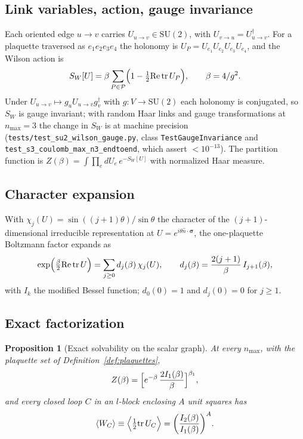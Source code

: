 \documentclass[11pt]{article}
\newtheorem{proposition}{Proposition}
\begin{document}
\subsection{Link variables, action, gauge invariance}

Each oriented edge $u\to v$ carries $U_{u\to v}\in\mathrm{SU}(2)$, with
$U_{v\to u}=U_{u\to v}^{\dagger}$.  For a plaquette traversed as
$e_1e_2e_3e_4$ the holonomy is $U_P=U_{e_1}U_{e_2}U_{e_3}U_{e_4}$, and the
Wilson action is
\begin{equation}
S_W[U] = \beta\sum_{P\in\mathcal{P}}\Bigl(1-\tfrac12\mathrm{Re}\,\mathrm{tr}\,U_P\Bigr),
\qquad \beta = 4/g^2 .
\label{eq:wilson_action}
\end{equation}
Under $U_{u\to v}\mapsto g_uU_{u\to v}g_v^{\dagger}$ with $g:V\to\mathrm{SU}(2)$
each holonomy is conjugated, so $S_W$ is gauge invariant; with random Haar
links and gauge transformations at $n_{\max}=3$ the change in $S_W$ is at
machine precision (\texttt{tests/test\_su2\_wilson\_gauge.py}, class
\texttt{TestGaugeInvariance} and \texttt{test\_s3\_coulomb\_max\_n3\_endtoend},
which assert $<10^{-13}$).  The partition function is
$Z(\beta)=\int\prod_e dU_e\,e^{-S_W[U]}$ with normalized Haar measure.

\subsection{Character expansion}
\label{sec:characters}

With $\chi_j(U)=\sin((j+1)\theta)/\sin\theta$ the character of the
$(j+1)$-dimensional irreducible representation at
$U=e^{i\theta\hat n\cdot\boldsymbol\sigma}$, the one-plaquette Boltzmann
factor expands as~\cite{menotti_onofri1981,creutz1983}
\begin{equation}
\exp\Bigl(\tfrac{\beta}{2}\mathrm{Re}\,\mathrm{tr}\,U\Bigr)
=\sum_{j\ge0} d_j(\beta)\,\chi_j(U),\qquad
d_j(\beta)=\frac{2(j+1)}{\beta}\,I_{j+1}(\beta),
\label{eq:character_expansion}
\end{equation}
with $I_k$ the modified Bessel function; $d_0(0)=1$ and $d_j(0)=0$ for
$j\ge1$.

\subsection{Exact factorization}
\label{sec:factorization}

\begin{proposition}[Exact solvability on the scalar graph]
\label{prop:factorization}
At every $n_{\max}$, with the plaquette set of Definition~\ref{def:plaquettes},
\begin{equation}
Z(\beta) = \Bigl[e^{-\beta}\,\frac{2I_1(\beta)}{\beta}\Bigr]^{\beta_1},
\label{eq:Z_exact}
\end{equation}
and every closed loop $C$ in an $l$-block enclosing $A$ unit squares has
\begin{equation}
\langle W_C\rangle \equiv
\Bigl\langle\tfrac12\mathrm{tr}\,U_C\Bigr\rangle
= \biggl(\frac{I_2(\beta)}{I_1(\beta)}\biggr)^{A}.
\label{eq:W_exact}
\end{equation}
\end{proposition}
\end{document}
